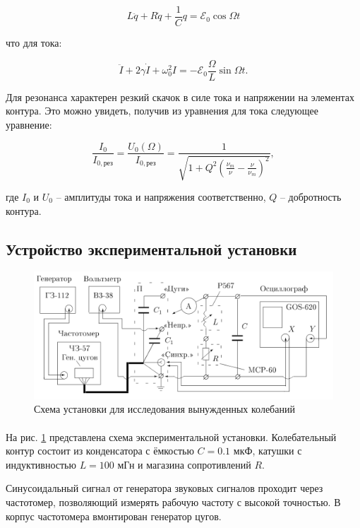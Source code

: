 \documentclass[a4paper,12pt]{article} %
\begin{document}
\[ L \ddot{q} + R \dot{q} + \frac{1}{C} q = \mathcal{E}_0 \cos{\Omega t}
\]

\noindent что для тока:

\[ \ddot{I} + 2 \gamma \dot{I} + \omega_0^2 I = - \mathcal{E}_0 \frac{\Omega}{L} \sin{\Omega t}.
\]

Для резонанса характерен резкий скачок в силе тока и напряжении на элементах контура. Это можно увидеть, получив из уравнения для тока следующее уравнение:

\[ \frac{I_0}{I_{0, \text{рез}}} = \frac{U_0 (\Omega)}{I_{0, \text{рез}}} = \frac{1}{\sqrt{1 + Q^2 \left( \frac{\nu_m}{\nu} - \frac{\nu}{\nu_m} \right)^2}},
\]

\noindent где $I_0$ и $U_0$ -- амплитуды тока и напряжения соответственно, $Q$ -- добротность контура. 

\subsection{Устройство экспериментальной установки}


\begin{figure}[h]
\begin{center}
\includegraphics[width=\textwidth]{setup.png}
\caption{Схема установки для исследования вынужденных колебаний}
\label{fig:setup}
\end{center}
\end{figure}

\paragraph{} На рис. \ref{fig:setup} представлена схема экспериментальной установки. Колебательный контур состоит из конденсатора с ёмкостью $C = 0.1$ мкФ, катушки с индуктивностью $L = 100$ мГн и магазина сопротивлений $R$. 

Синусоидальный сигнал от генератора звуковых сигналов проходит через частотомер, позволяющий измерять рабочую частоту с высокой точностью. В корпус частотомера вмонтирован генератор цугов.
\end{document}
